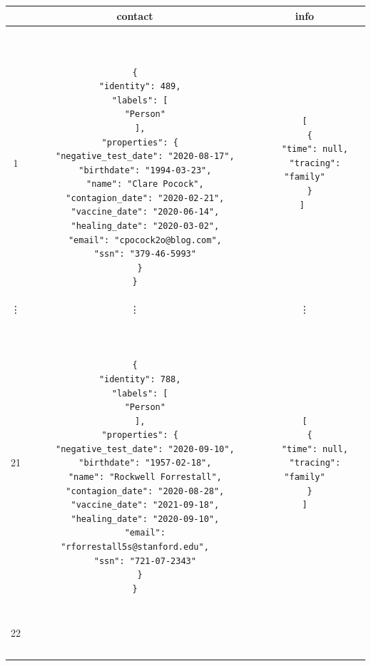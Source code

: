 \documentclass[12pt, a4paper]{article}
\begin{document}
\begin{scriptsize}
    \begin{center}
        \begin{longtable}{ |c|c|c| } 
            \hline
            \endfirsthead %
            & contact & info \\
            \hline
            1 &
            \begin{minipage}{7,2cm}
                \begin{verbatim}


{
  "identity": 489,
  "labels": [
    "Person"
  ],
  "properties": {
    "negative_test_date": "2020-08-17",
    "birthdate": "1994-03-23",
    "name": "Clare Pocock",
    "contagion_date": "2020-02-21",
    "vaccine_date": "2020-06-14",
    "healing_date": "2020-03-02",
    "email": "cpocock2o@blog.com",
    "ssn": "379-46-5993"
  }
}
                \end{verbatim}
            \end{minipage}
            & 
            \begin{minipage}{5cm}
                \begin{verbatim}
[
  {
    "time": null,
    "tracing": "family"
  }
] 
                \end{verbatim}
            \end{minipage} \\
            \vdots & \vdots & \vdots \\
            21 &
            \begin{minipage}{7,2cm}
                \begin{verbatim}


{
  "identity": 788,
  "labels": [
    "Person"
  ],
  "properties": {
    "negative_test_date": "2020-09-10",
    "birthdate": "1957-02-18",
    "name": "Rockwell Forrestall",
    "contagion_date": "2020-08-28",
    "vaccine_date": "2021-09-18",
    "healing_date": "2020-09-10",
    "email": "rforrestall5s@stanford.edu",
    "ssn": "721-07-2343"
  }
}
                \end{verbatim}
            \end{minipage}
            & 
            \begin{minipage}{5cm}
                \begin{verbatim}
[
  {
    "time": null,
    "tracing": "family"
  }
]
                \end{verbatim}
            \end{minipage} \\*
            \hline
            22 &
            \begin{minipage}{7,2cm}
                \begin{verbatim}



\end{verbatim}
\end{minipage}
\end{longtable}
\end{center}
\end{scriptsize}
\end{document}
